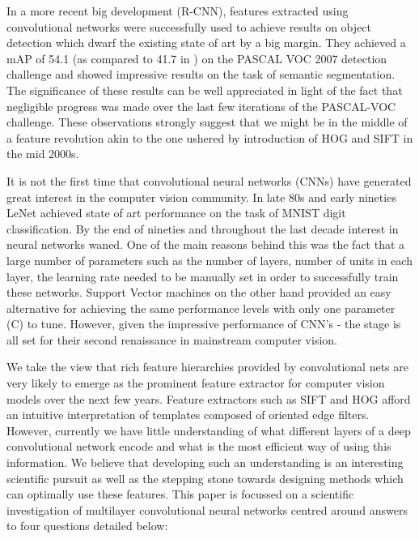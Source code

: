 \documentclass[runningheads]{llncs}
\begin{document}
In a more recent big development (R-CNN)\cite{Rcnn}, features extracted using convolutional networks were successfully used to achieve results on object detection which dwarf the existing state of art by a big margin. They achieved a mAP of 54.1 (as compared to 41.7 in  \cite{regionlets}) on the PASCAL VOC 2007 detection challenge and showed impressive results on the task of semantic segmentation. The significance of these results can be well appreciated in light of the fact that negligible progress was made over the last few iterations of the PASCAL-VOC challenge. These observations strongly suggest that we might be in the middle of a feature revolution akin to the one ushered by introduction of HOG \cite{Hog} and SIFT \cite{Sift} in the mid 2000s.  

It is not the first time that convolutional neural networks (CNNs) have generated great interest in the computer vision community. In late 80s and early nineties LeNet \cite{Lecun89} achieved state of art performance on the task of MNIST digit classification. By the end of nineties and throughout the last decade interest in neural networks waned. One of the main reasons behind this was the fact that a large number of parameters such as the number of layers, number of units in each layer, the learning rate needed to be manually set in order to successfully train these networks. Support Vector machines on the other hand provided an easy alternative for achieving the same performance levels with only one parameter (C) to tune. However, given the impressive performance of CNN's - the stage is all set for their second renaissance in mainstream computer vision. 

We take the view that rich feature hierarchies provided by convolutional nets  are very likely to emerge as the prominent feature extractor for computer vision models over the next few years. Feature extractors such as SIFT and HOG afford an intuitive interpretation of templates composed of oriented edge filters. However, currently we have little understanding of what different layers of a deep convolutional network encode and what is the most efficient way of using this information. We believe that developing such an understanding is an interesting scientific pursuit as well as  the stepping stone towards designing methods which can optimally use these features.  
This paper is focussed on a scientific investigation of multilayer convolutional neural networks centred around answers to four questions detailed below:
\end{document}
